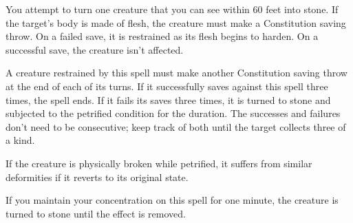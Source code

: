 You attempt to turn one creature that you can see within 60 feet into stone. If the target’s body is made of flesh, the creature must make a Constitution saving throw. On a failed save, it is restrained as its flesh begins to harden. On a successful save, the creature isn’t affected.

A creature restrained by this spell must make another Constitution saving throw at the end of each of its turns. If it successfully saves against this spell three times, the spell ends. If it fails its saves three times, it is turned to stone and subjected to the petrified condition for the duration. The successes and failures don’t need to be consecutive; keep track of both until the target collects three of a kind.

If the creature is physically broken while petrified, it suffers from similar deformities if it reverts to its original state.

If you maintain your concentration on this spell for one minute, the creature is turned to stone until the effect is removed.












